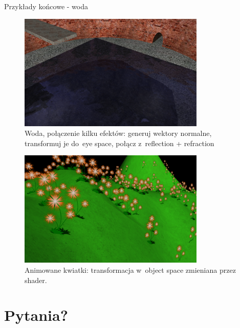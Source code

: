 \documentclass{beamer}
\begin{document}
\begin{frame}{Przykłady końcowe - woda}
\begin{figure}
  \centering
  \includegraphics[width=3.5in]{../water_shaders_3}
  \caption{Woda, połączenie kilku efektów: generuj wektory normalne, transformuj je do~eye space, połącz z~reflection + refraction}
\end{figure}
\end{frame}

\begin{frame}
\begin{figure}
  \centering
  \includegraphics[width=3.5in]{../flowers}
  \caption{Animowane kwiatki: transformacja w~object space zmieniana przez shader.}
\end{figure}
\end{frame}

\section{Pytania?}
\end{document}
